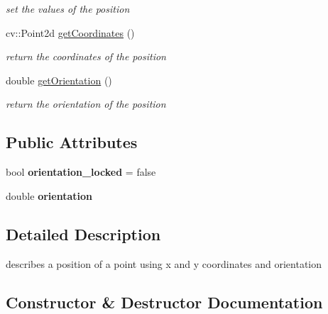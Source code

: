 \begin{DoxyCompactItemize}
\begin{DoxyCompactList}\small\item\em set the values of the position \end{DoxyCompactList}\item 
cv\+::\+Point2d \mbox{\hyperlink{class_path2_d_1_1_position_aad6d30712f50deea47f1d8994a5ede85}{get\+Coordinates}} ()
\begin{DoxyCompactList}\small\item\em return the coordinates of the position \end{DoxyCompactList}\item 
double \mbox{\hyperlink{class_path2_d_1_1_position_a092e7b2a7dc639ba12c0650a226bbe39}{get\+Orientation}} ()
\begin{DoxyCompactList}\small\item\em return the orientation of the position \end{DoxyCompactList}\end{DoxyCompactItemize}
\subsection*{Public Attributes}
\begin{DoxyCompactItemize}
\item 
\mbox{\label{class_path2_d_1_1_position_a8445f3a8c38035ac53cc1739fae24fdc}} 
bool {\bfseries orientation\+\_\+locked} = false
\item 
\mbox{\label{class_path2_d_1_1_position_a7f8a515c96ec90efe3733e150aa76489}} 
double {\bfseries orientation}
\end{DoxyCompactItemize}


\subsection{Detailed Description}
describes a position of a point using x and y coordinates and orientation 

\subsection{Constructor \& Destructor Documentation}
\mbox{\label{class_path2_d_1_1_position_a1e399aed3b9ee6c939041fcf210d1aa6}} 
